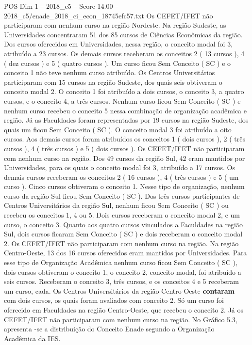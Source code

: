 \begin{textsample}{POS Dim 1 – 2018\_c5 – Score 14.00 – 2018\_c5/enade\_2018\_ci\_econ\_18745efc57.txt}
Os CEFET/IFET não participaram com nenhum curso na região Nordeste.
Na região Sudeste, as Universidades concentraram 51 dos 85 cursos de Ciências Econômicas da região.
Dos cursos oferecidos em Universidades, nessa região, o conceito modal foi 3, atribuído a 23 cursos.
Os demais cursos receberam os conceitos 2 ( 13 cursos ), 4 ( dez cursos ) e 5 ( quatro cursos ).
Um curso ficou Sem Conceito ( SC ) e o conceito 1 não teve nenhum curso atribuído.
Os Centros Universitários participaram com 15 cursos na região Sudeste, dos quais seis obtiveram o conceito modal 2.
O conceito 1 foi atribuído a dois cursos, o conceito 3, a quatro cursos, e o conceito 4, a três cursos.
Nenhum curso ficou Sem Conceito ( SC ) e nenhum curso recebeu o conceito 5 nessa combinação de organização acadêmica e região.
Já as Faculdades foram representadas por 19 cursos na região Sudeste, dos quais um ficou Sem Conceito ( SC ).
O conceito modal 3 foi atribuído a oito cursos.
Aos demais cursos foram atribuídos os conceitos 1 ( dois cursos ), 2 ( três cursos ), 4 ( três cursos ) e 5 ( dois cursos ).
Os CEFET/IFET não participaram com nenhum curso na região.
Dos 49 cursos da região Sul, 42 eram mantidos por Universidades, para os quais o conceito modal foi 3, atribuído a 17 cursos.
Os demais cursos receberam os conceitos 2 ( 16 cursos ), 4 ( três cursos ) e 5 ( um curso ).
Cinco cursos obtiveram o conceito 1.
Nesse tipo de organização, nenhum curso da região Sul ficou Sem Conceito ( SC ).
Dos três cursos participantes de Centros Universitários da região Sul, nenhum ficou Sem Conceito ( SC ) ou recebeu os conceitos 1, 4 ou 5.
Dois cursos receberam o conceito modal 2, e um curso, o conceito 3.
Quanto aos quatro cursos vinculados a Faculdades na região Sul, dois cursos ficaram Sem Conceito ( SC ) e dois receberam o conceito modal 2.
Os CEFET/IFET não participaram com nenhum curso na região.
Na região Centro-Oeste, 13 dos 16 cursos oferecidos eram mantidos por Universidades.
Para esse tipo de Organização Acadêmica nenhum curso ficou Sem Conceito ( SC ), dois cursos obtiveram o conceito 1, o conceito 2, conceito modal, foi atribuído a seis cursos.
Receberam o conceito 3, três cursos, e os conceitos 4 e 5 receberam um curso, cada.
Os Centros Universitários da região Centro-Oeste \textbf{contaram} com dois cursos, os quais foram avaliados com conceito 2.
Só um curso foi oferecido em Faculdades na região Centro-Oeste, que recebeu o conceito 2.
Já os CEFET/IFET não participaram com nenhum curso na região.
No Gráfico 5.3, apresenta -se a distribuição do Conceito Enade segundo a Organização Acadêmica da IES.

\end{textsample}
